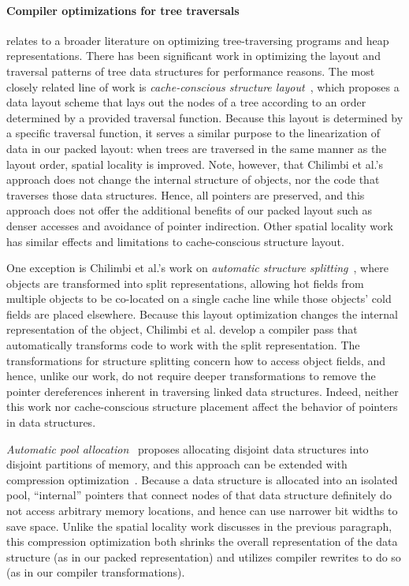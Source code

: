 
\paragraph{Compiler optimizations for tree traversals}

\ourcalc{} relates to a broader literature on optimizing
tree-traversing programs and heap representations.
%
There has been significant work in optimizing the layout and
traversal patterns of tree data structures for performance reasons.
%
The most closely related line of work is \emph{cache-conscious structure
  layout}~\cite{chilimbi1999}, which proposes a data layout scheme that lays out
the nodes of a tree according to an order determined by a provided traversal
function. Because this layout is determined by a specific traversal function,
it serves a similar purpose to the linearization of data in our packed layout:
when trees are traversed in the same manner as the layout order, spatial
locality is improved. Note, however, that Chilimbi et al.'s approach does not
change the internal structure of objects, nor the code that traverses those
data structures. Hence, all pointers are preserved, and this approach does not
offer the additional benefits of our packed layout such as denser accesses and
avoidance of pointer indirection. Other spatial locality
work~\cite{Truong1998,Lattner2005,Chilimbi1999a} has similar effects and
limitations to cache-conscious structure layout.

One exception is Chilimbi et al.'s work on \emph{automatic structure
splitting}~\cite{Chilimbi1999b}, where objects are transformed into split
representations, allowing hot fields from multiple objects to be co-located on
a single cache line while those objects' cold fields are placed elsewhere.
Because this layout optimization changes the internal representation of the
object, Chilimbi et al. develop a compiler pass that automatically transforms
code to work with the split representation. The transformations for structure
splitting concern how to access object fields, and hence, unlike our work, do
not require deeper transformations to remove the pointer dereferences inherent
in traversing linked data structures. Indeed, neither this work nor
cache-conscious structure placement affect the behavior of pointers in data
structures.

\emph{Automatic pool allocation}~\cite{Lattner2005} proposes
allocating disjoint data structures into disjoint partitions of
memory, and this approach can be extended with compression
optimization~\cite{Lattner2005mspc}. Because a data structure is
allocated into an isolated pool, ``internal'' pointers that connect
nodes of that data structure definitely do not access arbitrary memory
locations, and hence can use narrower bit widths to save space. Unlike
the spatial locality work discusses in the previous paragraph, this
compression optimization both shrinks the overall representation of
the data structure (as in our packed representation) and utilizes
compiler rewrites to do so (as in our compiler transformations).

